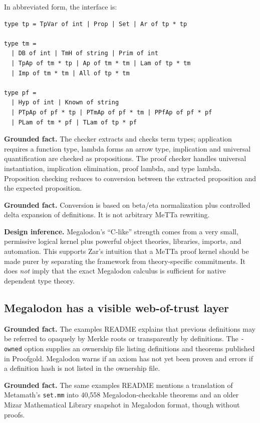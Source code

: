 \documentclass[11pt]{article}
\newcommand{\MeTTa}{\textup{MeTTa}}
\newcommand{\Megalodon}{\textup{Megalodon}}
\newcommand{\code}[1]{\texttt{#1}}
\newcommand{\Fact}{\textbf{Grounded fact.}}
\newcommand{\Infer}{\textbf{Design inference.}}
\begin{document}
In abbreviated form, the interface is:

\begin{lstlisting}[caption={Megalodon core syntax shape, abbreviated from src/syntax.mli}]
type tp = TpVar of int | Prop | Set | Ar of tp * tp

type tm =
  | DB of int | TmH of string | Prim of int
  | TpAp of tm * tp | Ap of tm * tm | Lam of tp * tm
  | Imp of tm * tm | All of tp * tm

type pf =
  | Hyp of int | Known of string
  | PTpAp of pf * tp | PTmAp of pf * tm | PPfAp of pf * pf
  | PLam of tm * pf | TLam of tp * pf
\end{lstlisting}

\Fact{} The checker extracts and checks term types; application requires a function type, lambda forms an arrow type, implication and universal quantification are checked as propositions.  The proof checker handles universal instantiation, implication elimination, proof lambda, and type lambda.  Proposition checking reduces to conversion between the extracted proposition and the expected proposition.\cite{megalodon-termcheck,megalodon-proofcheck}

\Fact{} Conversion is based on beta/eta normalization plus controlled delta expansion of definitions.  It is not arbitrary \MeTTa{} rewriting.\cite{megalodon-conv}

\Infer{} \Megalodon{}'s ``C-like'' strength comes from a very small, permissive logical kernel plus powerful object theories, libraries, imports, and automation.  This supports Zar's intuition that a \MeTTa{} proof kernel should be made purer by separating the framework from theory-specific commitments.  It does \emph{not} imply that the exact \Megalodon{} calculus is sufficient for native dependent type theory.

\subsection{Megalodon has a visible web-of-trust layer}

\Fact{} The examples README explains that previous definitions may be referred to opaquely by Merkle roots or transparently by definitions.  The \code{-owned} option supplies an ownership file listing definitions and theorems published in Proofgold.  Megalodon warns if an axiom has not yet been proven and errors if a definition hash is not listed in the ownership file.\cite{megalodon-examples}

\Fact{} The same examples README mentions a translation of Metamath's \code{set.mm} into 40,558 \Megalodon{}-checkable theorems and an older Mizar Mathematical Library snapshot in \Megalodon{} format, though without proofs.\cite{megalodon-examples}
\end{document}
